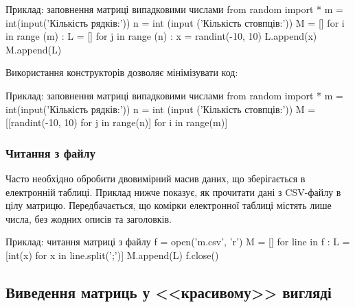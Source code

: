 \begin{py}{Приклад: заповнення матриці випадковими числами}
from random import *
m = int(input('Кількість рядків:'))
n = int (input ('Кількість стовпців:'))
M = []
for i in range (m) :
    L = []
    for j in range (n) :
        x = randint(-10, 10)
        L.append(x)
    M.append(L)
\end{py}
\noindent Використання конструкторів дозволяє мінімізувати код:
\begin{py}{Приклад: заповнення матриці випадковими числами}
from random import *
m = int(input('Кількість рядків:'))
n = int (input ('Кількість стовпців:'))
M = [[randint(-10, 10) for j in range(n)] for i in range(m)]
\end{py}

\subsubsection{Читання з файлу}

Часто необхідно обробити двовимірний масив даних, що зберігається в електронній таблиці. Приклад нижче показує, як прочитати дані з \textsf{CSV}-файлу в цілу матрицю. Передбачається, що комірки електронної таблиці містять лише числа, без жодних описів та заголовків.

\begin{py}{Приклад: читання матриці з файлу}
f = open('m.csv', 'r')
M = []
for line in f :
    L = [int(x) for x in line.split(';')]
    M.append(L)
f.close()
\end{py}

\subsection{Виведення матриць у <<красивому>> вигляді}\label{moutput}


